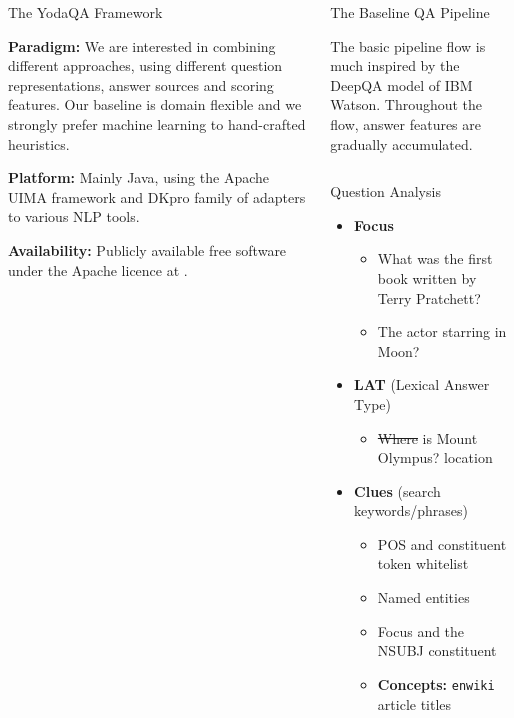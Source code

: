 \documentclass[xcolor=table]{beamer}
\let\olditem\item
\renewcommand\item{\olditem\justifying}
\begin{document}
\begin{frame}[fragile]{}
\begin{columns}[t]
\begin{block}{The YodaQA Framework}
\begin{multicols}{2}
	\alert{\bfseries\sffamily Paradigm:} We are interested in \alert{combining
	different approaches}, using different
	question representations, answer sources and scoring features.
	Our baseline is \alert{domain flexible}
	and we strongly prefer machine learning to hand-crafted heuristics.


	\alert{\bfseries\sffamily Platform:} Mainly Java, using the Apache UIMA
	framework and DKpro family of adapters to various NLP tools.

	\alert{\bfseries\sffamily Availability:}
	Publicly available free software under the
	Apache licence at .
      \end{multicols}

    \end{block}

    \begin{block}{The Baseline QA Pipeline}

    \justifying
The basic pipeline flow is much inspired by the Deep\-QA model
of IBM Watson.  Throughout the flow, answer features
are gradually accumulated.

      \begin{columns}[t]

\begin{block}{Question Analysis}
	\begin{itemize}
		\item \textbf{Focus}
			\begin{itemize}
				\item What was the first \alert{book} written by Terry Pratchett?
				\item The \alert{actor} starring in Moon?
			\end{itemize}
		\item \textbf{LAT} (Lexical Answer Type)
			\begin{itemize}
				\item \alert{\sout{Where}} is Mount Olympus? \alert{location}
			\end{itemize}
		\item \textbf{Clues} (search keywords/phrases)
			\begin{itemize}
				\item POS and constituent token whitelist
				\item Named entities
				\item Focus and the NSUBJ constituent
				\item \textbf{Concepts:} \texttt{enwiki} article titles
			\end{itemize}
	\end{itemize}


\end{block}
\end{columns}
\end{block}
\end{columns}
\end{frame}
\end{document}
